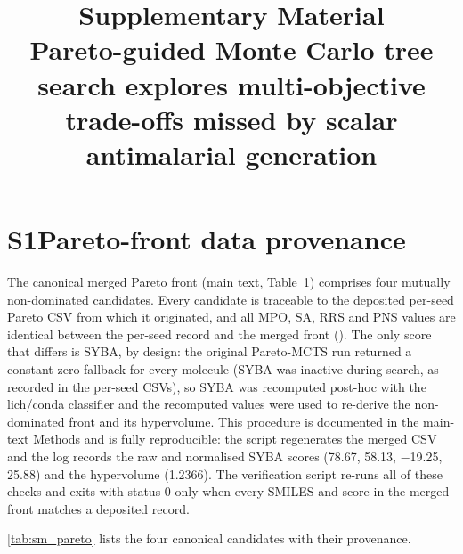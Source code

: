\documentclass[10pt,a4paper]{article}
\title{\textbf{Supplementary Material}\\[0.4em]
\large Pareto-guided Monte Carlo tree search explores multi-objective
trade-offs missed by scalar antimalarial generation}
\author{}
\date{}
\begin{document}
\maketitle

\section*{S1\hspace{0.6em}Pareto-front data provenance}

The canonical merged Pareto front (main text, Table~1) comprises four mutually
non-dominated candidates. Every candidate is traceable to the deposited
per-seed Pareto CSV  from which it originated,
and all MPO, SA, RRS and PNS values are identical between the per-seed record
and the merged front (). The only
score that differs is SYBA, by design: the original Pareto-MCTS run returned a
constant zero fallback for every molecule (SYBA was inactive during search, as
recorded in the per-seed CSVs), so SYBA was recomputed post-hoc with the
lich/conda classifier and the recomputed values were used to re-derive the
non-dominated front and its hypervolume. This procedure is documented in the
main-text Methods and is fully reproducible: the script
 regenerates the merged CSV and the
log  records the raw and normalised
SYBA scores (\SI{78.67}{}, \SI{58.13}{}, \num{-19.25}, \SI{25.88}{}) and the
hypervolume (\num{1.2366}). The verification script
 re-runs all of these checks and
exits with status 0 only when every SMILES and score in the merged front
matches a deposited record.

\cref{tab:sm_pareto} lists the four canonical candidates with their provenance.
\end{document}
